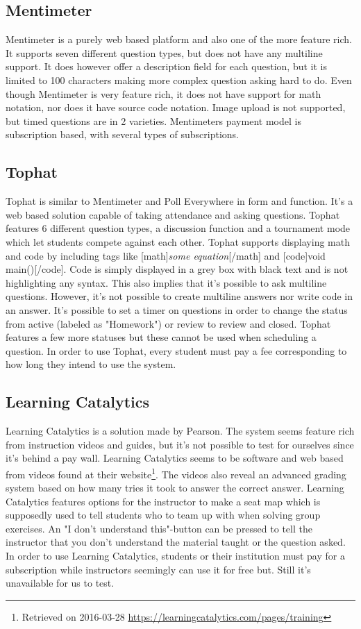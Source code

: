 \subsection*{Mentimeter}
Mentimeter is a purely web based platform and also one of the more feature rich. It supports seven different question types, but does not have any multiline support. It does however offer a description field for each question, but it is limited to 100 characters making more complex question asking hard to do. Even though Mentimeter is very feature rich, it does not have support for math notation, nor does it have source code notation.  Image upload is not supported, but timed questions are in 2 varieties. Mentimeters payment model is subscription based, with several types of subscriptions. 

\subsection*{Tophat}
Tophat is similar to Mentimeter and Poll Everywhere in form and function. It's a web based solution capable of taking attendance and asking questions. Tophat features 6 different question types, a discussion function and a tournament mode which let students compete against each other. Tophat supports displaying math and code by including tags like [math]\emph{some equation}[/math] and [code]void main()[/code]. Code is simply displayed in a grey box with black text and is not highlighting any syntax. This also implies that it's possible to ask multiline questions. However, it's not possible to create multiline answers nor write code in an answer. It's possible to set a timer on questions in order to change the status from active (labeled as "Homework") or review to review and closed. Tophat features a few more statuses but these cannot be used when scheduling a question. In order to use Tophat, every student must pay a fee corresponding to how long they intend to use the system.

\subsection*{Learning Catalytics}
Learning Catalytics is a solution made by Pearson. The system seems feature rich from instruction videos and guides, but it's not possible to test for ourselves since it's behind a pay wall. Learning Catalytics seems to be software and web based from videos found at their website\footnote{Retrieved on 2016-03-28 \url{https://learningcatalytics.com/pages/training}}. The videos also reveal an advanced grading system based on how many tries it took to answer the correct answer. Learning Catalytics features options for the instructor to make a seat map which is supposedly used to tell students who to team up with when solving group exercises. An "I don't understand this"-button can be pressed to tell the instructor that you don't understand the material taught or the question asked. In order to use Learning Catalytics, students or their institution must pay for a subscription while instructors seemingly can use it for free but. Still it's unavailable for us to test.

